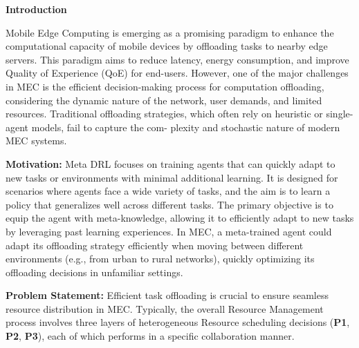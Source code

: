 \documentclass[12pt]{article}
\begin{document}
\noindent\large\textbf{Introduction}

\vspace{1.5mm}
\normalsize

Mobile Edge Computing is emerging as a promising paradigm to enhance the computational capacity of mobile devices by offloading tasks to nearby edge servers. This paradigm aims to reduce latency, energy consumption, and improve Quality of Experience (QoE) for end-users. However, one of the major challenges in MEC is the efficient decision-making process for computation offloading, considering the dynamic nature of the network, user demands, and limited resources. Traditional offloading strategies, which often rely on heuristic or single-agent models, fail to capture the com- plexity and stochastic nature of modern MEC systems. 

\newpage

\noindent\textbf{\large Motivation:  }
\noindent
Meta DRL focuses on training agents that can quickly adapt to new tasks or environments with minimal additional learning. It is designed for scenarios where agents face a wide variety of tasks, and the aim is to learn a policy that generalizes well across different tasks. The primary objective is to equip the agent with meta-knowledge, allowing it to efficiently adapt to new tasks by leveraging past learning experiences. In MEC, a meta-trained agent could adapt its offloading strategy efficiently when moving between different environments (e.g., from urban to rural networks), quickly optimizing its offloading decisions in unfamiliar settings.


\vspace{3mm}



\noindent\textbf{\large Problem Statement: } Efficient task offloading is crucial to ensure seamless resource distribution in MEC.
Typically, the overall Resource Management process involves three layers of heterogeneous Resource scheduling decisions (\textbf{P1}, \textbf{P2}, \textbf{P3}), each of which performs in a specific collaboration manner. \vspace{-2mm}
\end{document}
